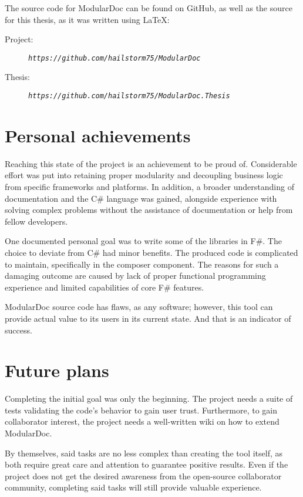 The source code for ModularDoc can be found on GitHub, as well as the source for this thesis, as it was written using \LaTeX:
\begin{description}
    \item[Project:] \textit{\nolinkurl{https://github.com/hailstorm75/ModularDoc}}
    \item[Thesis:] \textit{\nolinkurl{https://github.com/hailstorm75/ModularDoc.Thesis}}
\end{description}

\section*{Personal achievements}

Reaching this state of the project is an achievement to be proud of. Considerable effort was put into retaining proper modularity and decoupling business logic from specific frameworks and platforms. In addition, a broader understanding of documentation and the C\# language was gained, alongside experience with solving complex problems without the assistance of documentation or help from fellow developers.

One documented personal goal was to write some of the libraries in F\#. The choice to deviate from C\# had minor benefits. The produced code is complicated to maintain, specifically in the composer component. The reasons for such a damaging outcome are caused by lack of proper functional programming experience and limited capabilities of core F\# features.

ModularDoc source code has flaws, as any software; however, this tool can provide actual value to its users in its current state. And that is an indicator of success.

\section*{Future plans}

Completing the initial goal was only the beginning. The project needs a suite of tests validating the code's behavior to gain user trust. Furthermore, to gain collaborator interest, the project needs a well-written wiki on how to extend ModularDoc.

By themselves, said tasks are no less complex than creating the tool itself, as both require great care and attention to guarantee positive results. Even if the project does not get the desired awareness from the open-source collaborator community, completing said tasks will still provide valuable experience.
